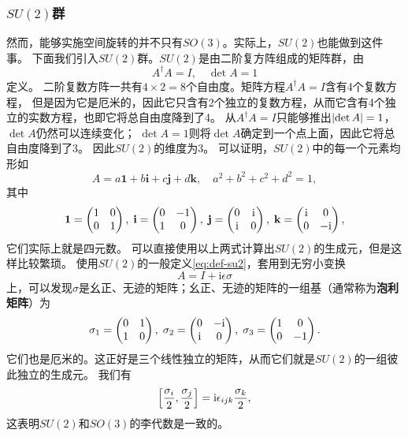 \documentclass[hyperref, UTF8, a4paper]{ctexart}
\newcommand*{\ii}{\mathrm{i}}
\begin{document}
\subsubsection{$SU(2)$群}

然而，能够实施空间旋转的并不只有$SO(3)$。实际上，$SU(2)$也能做到这件事。
下面我们引入$SU(2)$群。$SU(2)$是由二阶复方阵组成的矩阵群，由
\begin{equation}
    A^\dagger A = I, \quad \det A = 1
    \label{eq:def-su2}
\end{equation}
定义。
二阶复数方阵一共有$4 \times 2 = 8$个自由度。矩阵方程$A^\dagger A = I$含有4个复数方程，
但是因为它是厄米的，因此它只含有2个独立的复数方程，从而它含有4个独立的实数方程，也即它将总自由度降到了4。
从$A^\dagger A = I$只能够推出$\abs{\det A} = 1$，$\det A$仍然可以连续变化；
$\det A = 1$则将$\det A$确定到一个点上面，因此它将总自由度降到了3。
因此$SU(2)$的维度为3。
可以证明，$SU(2)$中的每一个元素均形如
\begin{equation}
    A = a \mathbf{1} + b \mathbf{i} + c \mathbf{j} + d \mathbf{k}, \quad a^2 + b^2 + c^2 + d^2 = 1,
    \label{eq:su2-expression}
\end{equation}
其中
\begin{equation}
    \mathbf{1} = \pmqty{1 & 0 \\ 0 & 1}, \; \mathbf{i} = \pmqty{0 & -1 \\ 1 & 0}, \; 
    \mathbf{j} = \pmqty{0 & \ii \\ \ii & 0}, \; \mathbf{k} = \pmqty{\ii & 0 \\ 0 & -\ii},
    \label{eq:quad-basis}
\end{equation}
它们实际上就是四元数。
可以直接使用以上两式计算出$SU(2)$的生成元，但是这样比较繁琐。
使用$SU(2)$的一般定义\eqref{eq:def-su2}，套用到无穷小变换
\[
    A = I + \ii \epsilon \sigma
\]
上，可以发现$\sigma$是幺正、无迹的矩阵；幺正、无迹的矩阵的一组基（通常称为\textbf{泡利矩阵}）为
\begin{equation}
    \sigma_1 = \pmqty{0 & 1 \\ 1 & 0}, \; \sigma_2 = \pmqty{0 & -\ii \\ \ii & 0}, \; \sigma_3 = \pmqty{1 & 0 \\ 0 & -1}.
    \label{eq:sigma-matrix}
\end{equation}
它们也是厄米的。这正好是三个线性独立的矩阵，从而它们就是$SU(2)$的一组彼此独立的生成元。
我们有
\begin{equation}
    \comm{\frac{\sigma_i}{2}}{\frac{\sigma_j}{2}} = \ii \epsilon_{ijk} \frac{\sigma_k}{2},
\end{equation}
这表明$SU(2)$和$SO(3)$的李代数是一致的。
\end{document}
